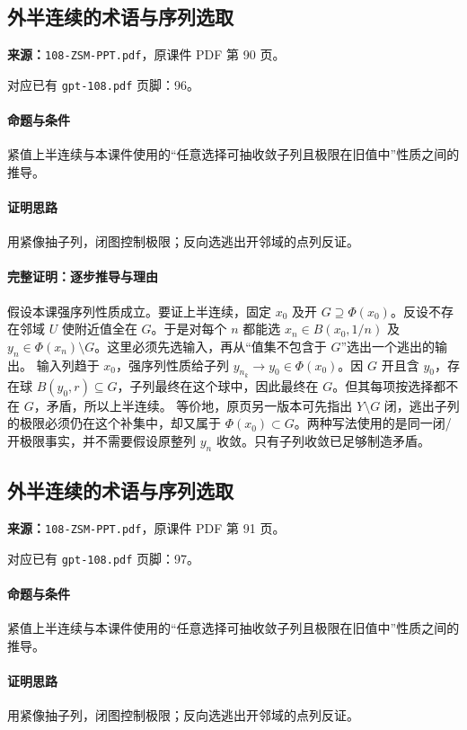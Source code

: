 \clearpage\subsection{外半连续的术语与序列选取}
\textbf{来源：}\texttt{108-ZSM-PPT.pdf}，原课件 PDF 第 90 页。\par
对应已有 \texttt{gpt-108.pdf} 页脚：96。\par
\paragraph{命题与条件}紧值上半连续与本课件使用的“任意选择可抽收敛子列且极限在旧值中”性质之间的推导。
\paragraph{证明思路}用紧像抽子列，闭图控制极限；反向选逃出开邻域的点列反证。
\paragraph{完整证明：逐步推导与理由}

假设本课强序列性质成立。要证上半连续，固定 $x_0$ 及开 $G\supseteq\Phi(x_0)$。反设不存在邻域 $U$ 使附近值全在 $G$。于是对每个 $n$ 都能选 $x_n\in B(x_0,1/n)$ 及 $y_n\in\Phi(x_n)\setminus G$。这里必须先选输入，再从“值集不包含于 $G$”选出一个逃出的输出。
输入列趋于 $x_0$，强序列性质给子列 $y_{n_k}\to y_0\in\Phi(x_0)$。因 $G$ 开且含 $y_0$，存在球 $B(y_0,r)\subseteq G$，子列最终在这个球中，因此最终在 $G$。但其每项按选择都不在 $G$，矛盾，所以上半连续。
等价地，原页另一版本可先指出 $Y\setminus G$ 闭，逃出子列的极限必须仍在这个补集中，却又属于 $\Phi(x_0)\subset G$。两种写法使用的是同一闭/开极限事实，并不需要假设原整列 $y_n$ 收敛。只有子列收敛已足够制造矛盾。

\clearpage\subsection{外半连续的术语与序列选取}
\textbf{来源：}\texttt{108-ZSM-PPT.pdf}，原课件 PDF 第 91 页。\par
对应已有 \texttt{gpt-108.pdf} 页脚：97。\par
\paragraph{命题与条件}紧值上半连续与本课件使用的“任意选择可抽收敛子列且极限在旧值中”性质之间的推导。
\paragraph{证明思路}用紧像抽子列，闭图控制极限；反向选逃出开邻域的点列反证。
